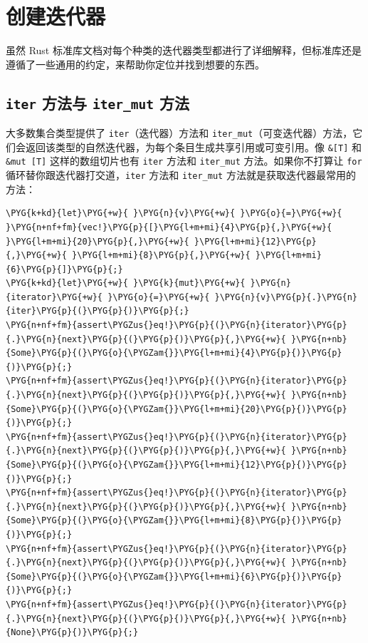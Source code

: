\section{创建迭代器}

虽然 Rust 标准库文档对每个种类的迭代器类型都进行了详细解释，但标准库还是遵循了一些通用的约定，来帮助你定位并找到想要的东西。

\subsection{\texttt{iter} 方法与 \texttt{iter\_mut} 方法}

大多数集合类型提供了 \texttt{iter}（迭代器）方法和 \texttt{iter\_mut}（可变迭代器）方法，它们会返回该类型的自然迭代器，为每个条目生成共享引用或可变引用。像 \texttt{\&[T]} 和 \texttt{\&mut [T]} 这样的数组切片也有 \texttt{iter} 方法和 \texttt{iter\_mut} 方法。如果你不打算让 \texttt{for} 循环替你跟迭代器打交道，\texttt{iter} 方法和 \texttt{iter\_mut} 方法就是获取迭代器最常用的方法：

\begin{Verbatim}[commandchars=\\\{\},breaklines=true,breakanywhere=true,fontsize=\codefont,xleftmargin=17bp]
\PYG{k+kd}{let}\PYG{+w}{ }\PYG{n}{v}\PYG{+w}{ }\PYG{o}{=}\PYG{+w}{ }\PYG{n+nf+fm}{vec!}\PYG{p}{[}\PYG{l+m+mi}{4}\PYG{p}{,}\PYG{+w}{ }\PYG{l+m+mi}{20}\PYG{p}{,}\PYG{+w}{ }\PYG{l+m+mi}{12}\PYG{p}{,}\PYG{+w}{ }\PYG{l+m+mi}{8}\PYG{p}{,}\PYG{+w}{ }\PYG{l+m+mi}{6}\PYG{p}{]}\PYG{p}{;}
\PYG{k+kd}{let}\PYG{+w}{ }\PYG{k}{mut}\PYG{+w}{ }\PYG{n}{iterator}\PYG{+w}{ }\PYG{o}{=}\PYG{+w}{ }\PYG{n}{v}\PYG{p}{.}\PYG{n}{iter}\PYG{p}{(}\PYG{p}{)}\PYG{p}{;}
\PYG{n+nf+fm}{assert\PYGZus{}eq!}\PYG{p}{(}\PYG{n}{iterator}\PYG{p}{.}\PYG{n}{next}\PYG{p}{(}\PYG{p}{)}\PYG{p}{,}\PYG{+w}{ }\PYG{n+nb}{Some}\PYG{p}{(}\PYG{o}{\PYGZam{}}\PYG{l+m+mi}{4}\PYG{p}{)}\PYG{p}{)}\PYG{p}{;}
\PYG{n+nf+fm}{assert\PYGZus{}eq!}\PYG{p}{(}\PYG{n}{iterator}\PYG{p}{.}\PYG{n}{next}\PYG{p}{(}\PYG{p}{)}\PYG{p}{,}\PYG{+w}{ }\PYG{n+nb}{Some}\PYG{p}{(}\PYG{o}{\PYGZam{}}\PYG{l+m+mi}{20}\PYG{p}{)}\PYG{p}{)}\PYG{p}{;}
\PYG{n+nf+fm}{assert\PYGZus{}eq!}\PYG{p}{(}\PYG{n}{iterator}\PYG{p}{.}\PYG{n}{next}\PYG{p}{(}\PYG{p}{)}\PYG{p}{,}\PYG{+w}{ }\PYG{n+nb}{Some}\PYG{p}{(}\PYG{o}{\PYGZam{}}\PYG{l+m+mi}{12}\PYG{p}{)}\PYG{p}{)}\PYG{p}{;}
\PYG{n+nf+fm}{assert\PYGZus{}eq!}\PYG{p}{(}\PYG{n}{iterator}\PYG{p}{.}\PYG{n}{next}\PYG{p}{(}\PYG{p}{)}\PYG{p}{,}\PYG{+w}{ }\PYG{n+nb}{Some}\PYG{p}{(}\PYG{o}{\PYGZam{}}\PYG{l+m+mi}{8}\PYG{p}{)}\PYG{p}{)}\PYG{p}{;}
\PYG{n+nf+fm}{assert\PYGZus{}eq!}\PYG{p}{(}\PYG{n}{iterator}\PYG{p}{.}\PYG{n}{next}\PYG{p}{(}\PYG{p}{)}\PYG{p}{,}\PYG{+w}{ }\PYG{n+nb}{Some}\PYG{p}{(}\PYG{o}{\PYGZam{}}\PYG{l+m+mi}{6}\PYG{p}{)}\PYG{p}{)}\PYG{p}{;}
\PYG{n+nf+fm}{assert\PYGZus{}eq!}\PYG{p}{(}\PYG{n}{iterator}\PYG{p}{.}\PYG{n}{next}\PYG{p}{(}\PYG{p}{)}\PYG{p}{,}\PYG{+w}{ }\PYG{n+nb}{None}\PYG{p}{)}\PYG{p}{;}
\end{Verbatim}

